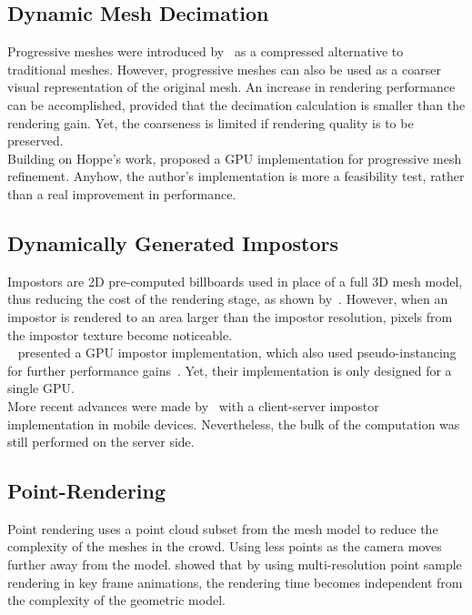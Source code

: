 \documentclass[6pt]{article} %
\begin{document}
\begin{multicols}{2}
\subsection{Dynamic Mesh Decimation}

Progressive meshes were introduced by~\cite{Hoppe1996} as a compressed alternative to traditional meshes.
However, progressive meshes can also be used as a coarser visual representation of the original mesh.
An increase in rendering performance can be accomplished, provided that the decimation calculation is smaller than the rendering gain.
Yet, the coarseness is limited if rendering quality is to be preserved.\\

Building on Hoppe's work, \cite{Hu2009} proposed a GPU implementation for progressive mesh refinement.
Anyhow, the author's implementation is more a feasibility test, rather than a real improvement in performance.

\subsection{Dynamically Generated Impostors}
\label{subsec:DimGenImpostors}

Impostors are 2D pre-computed billboards used in place of a full 3D mesh model, thus reducing the cost of the rendering stage, as shown by~\cite{Aubel2000}.
However, when an impostor is rendered to an area larger than the impostor resolution, pixels from the impostor texture become noticeable.\\

~\cite{Millan2006} presented a GPU impostor implementation, which also used pseudo-instancing for further performance gains~\cite{zelsnack2004glsl}.
Yet, their implementation is only designed for a single GPU.\\

More recent advances were made by~\cite{Ghiletiuc2013} with a client-server impostor implementation in mobile devices.
Nevertheless, the bulk of the computation was still performed on the server side.

\subsection{Point-Rendering}

Point rendering uses a point cloud subset from the mesh model to reduce the complexity of the meshes in the crowd.
Using less points as the camera moves further away from the model.
\cite{Wand2002} showed that by using multi-resolution point sample rendering in key frame animations, the rendering time becomes independent from the complexity of the geometric model.\\


\end{multicols}
\end{document}
